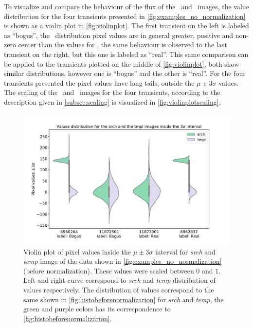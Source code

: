 To visualize and compare the behaviour of the flux of the \search\ and \temp\ images, the value distribution for the four transients presented in \autoref{fig:examples_no_normalization} is shown as a violin plot in \autoref{fig:violinplot}. The first transient on the left is labeled as ``bogus'', the \search\ distribution pixel values are in general greater, positive and non-zero center than the values for \temp, the same behaviour is observed to the last transient on the right, but this one is labeled as ``real''. This same comparison can be applied to the transients plotted on the middle of \autoref{fig:violinplot}, both show similar distributions, however one is ``bogus'' and the other is ``real''. For the four transients presented the pixel values have long tails, outside the $\mu \pm 3\sigma$ values. The scaling of the \search\ and \temp\ images for the four transients, according to the description given in \autoref{subsec:scaling} is visualized in \autoref{fig:violinplotscaling}. 

\begin{figure}
    \centering
    \includegraphics[width=0.6\linewidth]{
    figures/violin_plot.pdf}
    \caption{Violin plot of pixel values inside the $\mu \pm 3\sigma$ interval for \textit{srch} and \textit{temp} image of %
    the data shown in \autoref{fig:examples_no_normalization} (before normalization). These values were scaled between $0$ and $1$. Left and right curve correspond to \textit{srch} and \textit{temp} distribution of values respectively. The distribution of values correspond to the same shown in \autoref{fig:histobeforenormalizarion} for \textit{srch} and \textit{temp}, the green and purple colors has its correspondence to \autoref{fig:histobeforenormalizarion}.}
    \label{fig:violinplot}
\end{figure}



